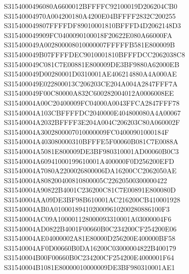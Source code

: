 \documentclass[12pt,a4paper]{article}
\begin{document}
\begin{framed}
{S3154000496080A6600012BFFFFC92100019D206204CB0\newline
S31540004970A004200180A4200E04BFFFF2832C200255\newline
S315400049807FFFFDF89010001810BFFFD4D2062148D3\newline
S315400049909FC0400090100018F20622E080A66000FA\newline
S315400049A002800008010000007FFFFFB581E800009B\newline
S315400049B07FFFFDEC9010001810BFFFDCC2062038C8\newline
S315400049C081C7E00881E800009DE3BF9880A62000EB\newline
S315400049D00280001D0310001AE406214880A4A000AE\newline
S315400049E022800013C206203CE204A004A2847FFF7A\newline
S315400049F00C80000A832C600282004012A0006008EE\newline
S31540004A00C20400009FC04000A0043FFCA2847FFF78\newline
S31540004A103CBFFFFDC2040000E404800080A4A00067\newline
S31540004A2032BFFFF3E204A004C206203C80A060002F\newline
S31540004A3002800007010000009FC04000901000184F\newline
S31540004A403080000310BFFFE5F00060B081C7E0088A\newline
S31540004A5081E800009DE3BF980310001AD00060B0C3\newline
S31540004A60941000199610001A400000F0D256200EFD\newline
S31540004A7080A2200026800006DA16200CC2062050AE\newline
S31540004A808200400810800005C22620500300000422\newline
S31540004A90822B4001C236200C81C7E00891E800080D\newline
S31540004AA09DE3BF98B610001AC216200CB410001928\newline
S31540004AB0A0100018941020009610200280886100F3\newline
S31540004AC09A100001128000093310001A03000004F6\newline
S31540004AD0822B4001F00660B0C234200CF254200E06\newline
S31540004AE04000002A81E80000D256200E400000BF58\newline
S31540004AF0D00660B0DA16200C03000004822B400179\newline
S31540004B00F00660B0C234200CF254200E4000001F64\newline
S31540004B1081E80000010000009DE3BF980310001AE1\newline
}
\end{framed}
\end{document}
